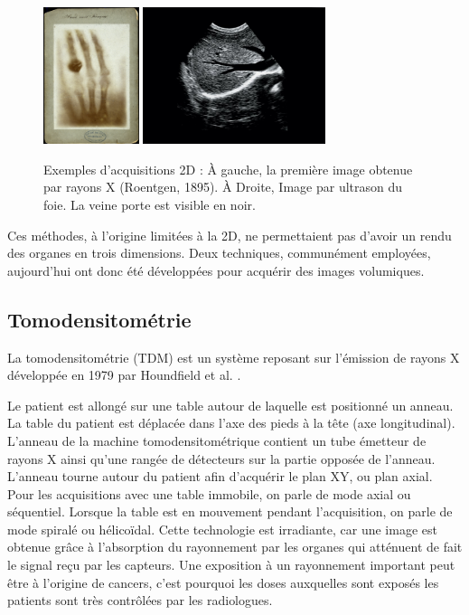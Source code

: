 \begin{figure}
    \centering
    \includegraphics[height=4cm]{Images/first_CT.png}
    \includegraphics[height=4cm]{Images/Liver_ultrasound.jpg}
    \caption{Exemples d'acquisitions 2D : À gauche, la première image obtenue par rayons X (Roentgen, 1895). À Droite, Image par ultrason du foie. La veine porte est visible en noir.}
    \label{fig:2D imaging}
\end{figure}

Ces méthodes, à l'origine limitées à la 2D, ne permettaient pas d'avoir un rendu des organes en trois dimensions. Deux techniques, communément employées, aujourd'hui ont donc été développées pour acquérir des images volumiques.

\subsection{Tomodensitométrie}
\label{sec:contexte:images:CT}

La tomodensitométrie (TDM) est un système reposant sur l'émission de rayons X développée en 1979 par Houndfield et al. \cite{Houndfield1995_CT_machine}.

Le patient est allongé sur une table autour de laquelle est positionné un anneau. La table du patient est déplacée dans l'axe des pieds à la tête (axe longitudinal). L'anneau de la machine tomodensitométrique contient un tube émetteur de rayons X ainsi qu'une rangée de détecteurs sur la partie opposée de l'anneau. L'anneau tourne autour du patient afin d'acquérir le plan XY, ou plan axial. Pour les acquisitions avec une table immobile, on parle de mode axial ou séquentiel. Lorsque la table est en mouvement pendant l'acquisition, on parle de mode spiralé ou hélicoïdal. Cette technologie est irradiante, car une image est obtenue grâce à l'absorption du rayonnement par les organes qui atténuent de fait le signal reçu par les capteurs.  Une exposition à un rayonnement important peut être à l'origine de cancers, c'est pourquoi les doses auxquelles sont exposés les patients sont très contrôlées par les radiologues.

